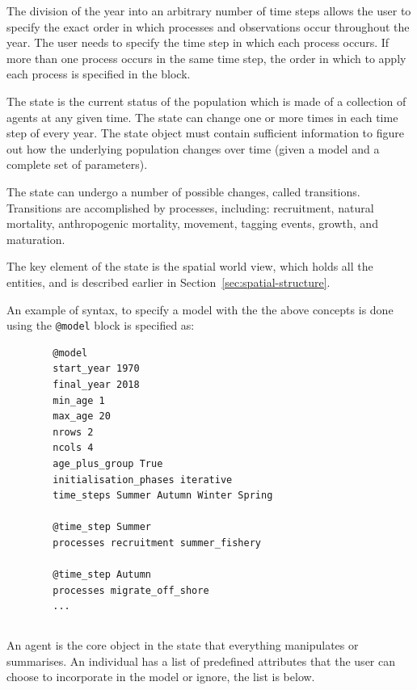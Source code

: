 The division of the year into an arbitrary number of time steps allows the user to specify the exact order in which processes and observations occur throughout the year. The user needs to specify the time step in which each process occurs. If more than one process occurs in the same time step, the order in which to apply each process is specified in the  block.

The state is the current status of the population which is made of a collection of agents at any given time. The state can change one or more times in each time step of every year. The state object must contain sufficient information to figure out how the underlying population changes over time (given a model and a complete set of parameters).

The state can undergo a number of possible changes, called transitions. Transitions are accomplished by processes, including: recruitment, natural mortality, anthropogenic mortality, movement, tagging events, growth, and maturation. 

The key element of the state is the spatial world view, which holds all the entities, and is described earlier in Section~\ref{sec:spatial-structure}.

An example of syntax, to specify a model with the the above concepts is done using the \texttt{@model} block is specified as:
{\small{\begin{verbatim}
		@model
		start_year 1970
		final_year 2018
		min_age 1
		max_age 20
		nrows 2
		ncols 4
		age_plus_group True
		initialisation_phases iterative
		time_steps Summer Autumn Winter Spring
		
		@time_step Summer
		processes recruitment summer_fishery 

		@time_step Autumn
		processes migrate_off_shore
		...
\end{verbatim}}}


\subsection{\label{sec:individuals}}
An agent is the core object in the state that everything manipulates or summarises. An individual has a list of predefined attributes that the user can choose to incorporate in the model or ignore, the list is below.

